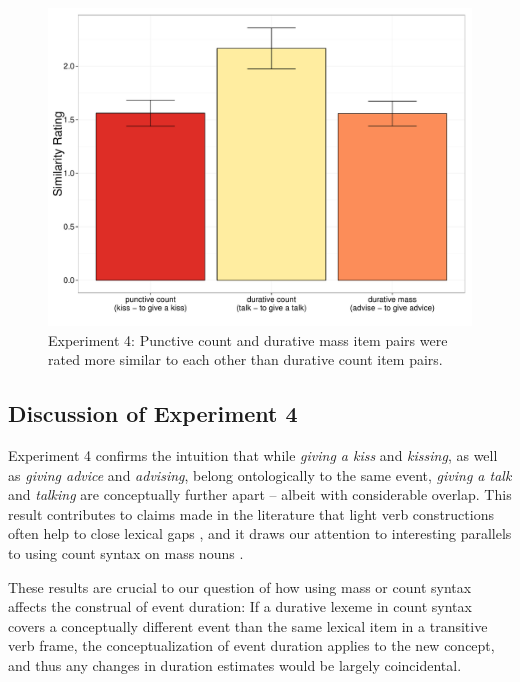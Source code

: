 \documentclass[review,12pt,authoryear]{elsarticle}
\newcommand*{\sectionformat}{\centering}
\begin{document}
\begin{figure}[t]
\centering
\includegraphics[width=\textwidth]{./Figures/Exp4_EventSimilarityBar.pdf}
\caption{Experiment 4: Punctive count and durative mass item pairs were rated more similar to each other than durative count item pairs. }
\label{fig_resSimilarity}
\end{figure}

\subsection*{\sectionformat Discussion of Experiment 4}\label{sec_discES}
Experiment 4 confirms the intuition that while \emph{giving a kiss} and \emph{kissing}, as well as \emph{giving advice} and \emph{advising}, belong ontologically to the same event, \emph{giving a talk} and \emph{talking} are conceptually further apart -- albeit with considerable overlap. This result contributes to claims made in the literature that light verb constructions often help to close lexical gaps \citep{miyagawa1989light,Grimshaw1988,glatz2006funktionsverbgefuge}, and it draws our attention to interesting parallels to using count syntax on mass nouns  \citep{gordon1985evaluating,srinivasan2015concepts,Wiese2005}.

These results are crucial to our question of how using mass or count syntax affects the construal of event duration: If a durative lexeme in count syntax covers a conceptually different event than the same lexical item in a transitive verb frame, the conceptualization of event duration applies to the new concept, and thus any changes in duration estimates would be largely coincidental.
\end{document}

